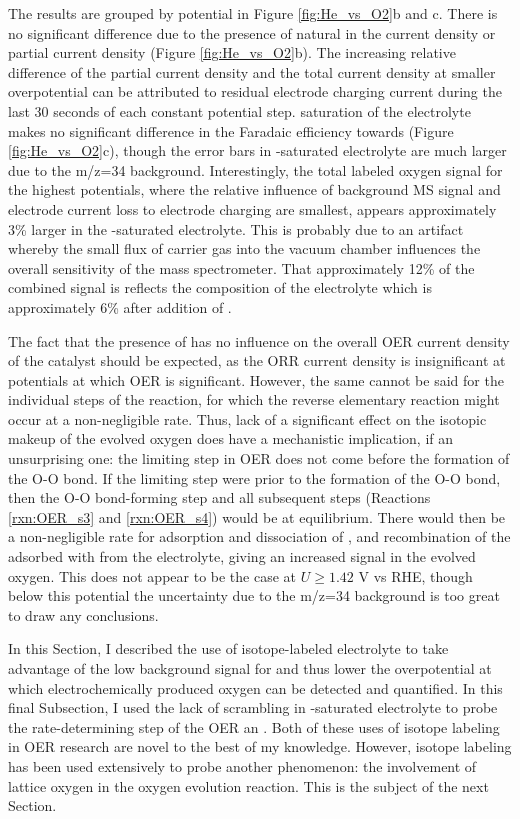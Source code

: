 The results are grouped by potential in Figure \ref{fig:He_vs_O2}b and c. There is no significant difference due to the presence of natural  in the current density or  partial current density (Figure \ref{fig:He_vs_O2}b). The increasing relative difference of the  partial current density and the total current density at smaller overpotential can be attributed to residual electrode charging current during the last 30 seconds of each constant potential step.  saturation of the electrolyte makes no significant difference in the Faradaic efficiency towards  (Figure \ref{fig:He_vs_O2}c), though the error bars in -saturated electrolyte are much larger due to the m/z=34 background. Interestingly, the total labeled oxygen signal for the highest potentials, where the relative influence of background MS signal and electrode current loss to electrode charging are smallest, appears approximately 3\% larger in the -saturated electrolyte. This is probably due to an artifact whereby the small flux of  carrier gas into the vacuum chamber influences the overall sensitivity of the mass spectrometer. That approximately 12\% of the combined  signal is  reflects the composition of the electrolyte which is approximately 6\%  after addition of .

The fact that the presence of  has no influence on the overall OER current density of the catalyst should be expected, as the ORR current density is insignificant at potentials at which OER is significant. However, the same cannot be said for the individual steps of the reaction, for which the reverse elementary reaction might occur at a non-negligible rate. Thus, lack of a significant effect on the isotopic makeup of the evolved oxygen does have a mechanistic implication, if an unsurprising one: the limiting step in OER does not come before the formation of the O-O bond. If the limiting step were prior to the formation of the O-O bond, then the O-O bond-forming step and all subsequent steps (Reactions \ref{rxn:OER_s3} and \ref{rxn:OER_s4}) would be at equilibrium. There would then be a non-negligible rate for adsorption and dissociation of , and recombination of the adsorbed  with  from the electrolyte, giving an increased  signal in the evolved oxygen. This does not appear to be the case at $U\ge1.42$ V vs RHE, though below this potential the uncertainty due to the m/z=34 background is too great to draw any conclusions. 

In this Section, I described the use of isotope-labeled electrolyte to take advantage of the low background signal for  and thus lower the overpotential at which electrochemically produced oxygen can be detected and quantified. In this final Subsection, I used the lack of scrambling in -saturated  electrolyte to probe the rate-determining step of the OER an . Both of these uses of isotope labeling in OER research are novel to the best of my knowledge. However, isotope labeling has been used extensively to probe another phenomenon: the involvement of lattice oxygen in the oxygen evolution reaction. This is the subject of the next Section.